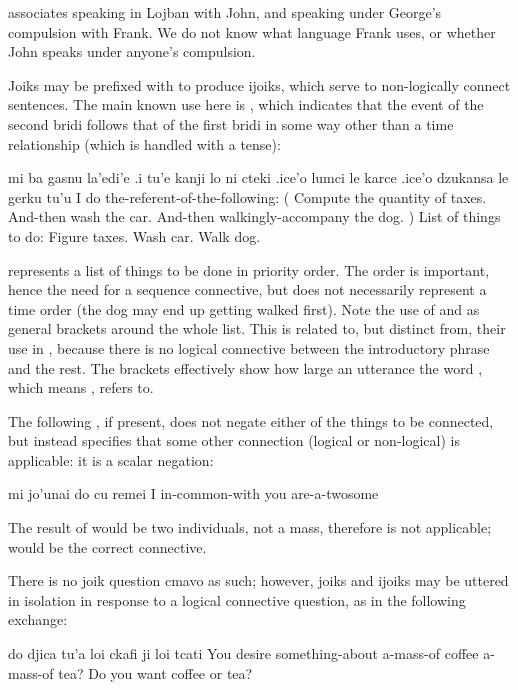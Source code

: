  associates speaking in
    Lojban with John, and speaking under George's compulsion with
    Frank. We do not know what language Frank uses, or whether John
    speaks under anyone's compulsion. 

Joiks may be prefixed with  to produce ijoiks, which
    serve to non-logically connect sentences. The main known use
    here is , which indicates that the event of the
    second bridi follows that of the first bridi in some way other
    than a time relationship (which is handled with a tense):
\begin{example}
mi ba gasnu la'edi'e\n
\T	.i tu'e kanji lo ni cteki\n
\T	.ice'o lumci le karce\n
\T	.ice'o dzukansa le gerku tu'u\n
I  do the-referent-of-the-following:\n
\T	( Compute the quantity of taxes.\n
\T	And-then wash the car.\n
\T	And-then walkingly-accompany the dog. )\n
List of things to do:\n
\T	Figure taxes.\n
\T	Wash car.\n
\T	Walk dog.
\end{example}

 represents a list of things
    to be done in priority order. The order is important, hence the
    need for a sequence connective, but does not necessarily
    represent a time order (the dog may end up getting walked
    first). Note the use of  and  as general
    brackets around the whole list. This is related to, but
    distinct from, their use in ,
    because there is no logical connective between the introductory
    phrase  and the rest. The brackets
    effectively show how large an utterance the word ,
    which means , refers to. 

The following , if present, does not negate either of
    the things to be connected, but instead specifies that some
    other connection (logical or non-logical) is applicable: it is
    a scalar negation:
\begin{example}
mi jo'unai do cu remei\n
I in-common-with  you are-a-twosome
\end{example}

The result of  would be two individuals, not a
    mass, therefore  is not applicable;  would be
    the correct connective.

There is no joik question cmavo as such; however, joiks and
    ijoiks may be uttered in isolation in response to a logical
    connective question, as in the following exchange:
\begin{example}
do djica tu'a\n
\T	loi ckafi\n
\T	ji loi tcati\n
You desire something-about\n
\T	a-mass-of coffee \n
\T	a-mass-of tea?\n
Do you want coffee or tea?
\end{example}


